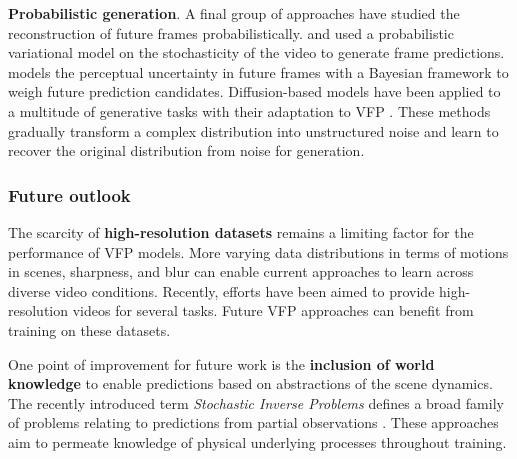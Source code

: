 \noindent
\textbf{Probabilistic generation}. A final group of approaches have studied the reconstruction of future frames probabilistically. \citet{babaeizadeh2018stochastic} and \citet{denton2018stochastic} used a probabilistic variational model on the stochasticity of the video to generate frame predictions. \citet{wang2020probabilistic} models the perceptual uncertainty in future frames with a Bayesian framework to weigh future prediction candidates. Diffusion-based models \citep{dhariwal2021diffusion,ho2020denoising,rombach2022high} have been applied to a multitude of generative tasks with their adaptation to VFP \citep{gu2023seer,hoppe2024diffusion,shrivastava2024video,voleti2022mcvd,ye2024stdiff,zhang2024extdm}. These methods gradually transform a complex distribution into unstructured noise and learn to recover the original distribution from noise for generation.

\subsubsection{Future outlook}


The scarcity of \textbf{high-resolution datasets} remains a limiting factor for the performance of VFP models. More varying data distributions in terms of motions in scenes, sharpness, and blur can enable current approaches to learn across diverse video conditions. Recently, efforts \citep{stergiou2024lavib,xue2022advancing} have been aimed to provide high-resolution videos for several tasks. Future VFP approaches can benefit from training on these datasets. 

One point of improvement for future work is the \textbf{inclusion of world knowledge} to enable predictions based on abstractions of the scene dynamics. The recently introduced term \textit{Stochastic Inverse Problems} defines a broad family of problems relating to predictions from partial observations \citep{spielberg2023differentiable,tewari2023diffusion}. These approaches aim to permeate knowledge of physical underlying processes throughout training.



